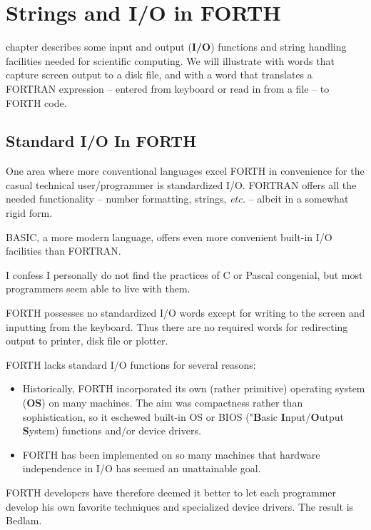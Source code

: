 \chapter{Strings and I/O in FORTH}
\startcontents[chapters]

 chapter describes some input and output (\textbf{I/O}) functions and string handling facilities needed for scientific computing. We will illustrate with words that capture screen output to a disk file, and with a word that translates a FORTRAN expression -- entered from keyboard or read in from a file -- to FORTH code.

\section{Standard I/O In FORTH}

One area where more conventional languages excel FORTH in convenience for the casual technical user/programmer is standardized I/O. FORTRAN offers all the needed functionality -- number formatting, strings, \textit{etc.} -- albeit in a somewhat rigid form.

BASIC, a more modern language, offers even more convenient built-in I/O facilities than FORTRAN.

I confess I personally do not find the practices of C or Pascal congenial, but most programmers seem able to live with them.

FORTH possesses no standardized I/O words except for writing to the screen and inputting from the keyboard. Thus there are no required words for redirecting output to printer, disk file or plotter.

FORTH lacks standard I/O functions for several reasons:

\begin{itemize}
    \item Historically, FORTH incorporated its own (rather primitive) operating system (\textbf{OS}) on many machines. The aim was compactness rather than sophistication, so it eschewed built-in OS or BIOS ("\textbf{B}asic \textbf{I}nput/\textbf{O}utput \textbf{S}ystem) functions and/or device drivers.
    \item FORTH has been implemented on so many machines that hardware independence in I/O has seemed an unattainable goal.
\end{itemize}

FORTH developers have therefore deemed it better to let each programmer develop his own favorite techniques and specialized device drivers. The result is Bedlam.

